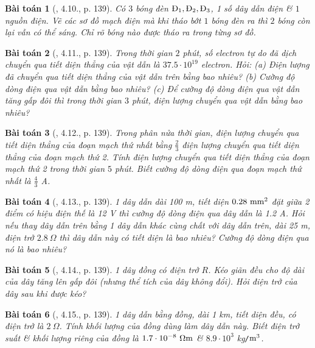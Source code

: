 \documentclass{article}
\newtheorem{baitoan}{Bài toán}
\begin{document}
\begin{baitoan}[\cite{Van_500_BT_Vat_Ly_THCS}, 4.10., p. 139]
	Có $3$ bóng đèn $\rm\mbox{Đ}_1,\mbox{Đ}_2,\mbox{Đ}_3$, 1 số dây dẫn điện \& $1$ nguồn điện. Vẽ các sơ đồ mạch điện mà khi tháo bớt $1$ bóng đèn ra thì $2$ bóng còn lại vẫn có thể sáng. Chỉ rõ bóng nào được tháo ra trong từng sơ đồ.
\end{baitoan}

\begin{baitoan}[\cite{Van_500_BT_Vat_Ly_THCS}, 4.11., p. 139]
	Trong thời gian $2$ phút, số electron tự do đã dịch chuyển qua tiết diện thẳng của vật dẫn là $37.5\cdot10^{19}$ electron. Hỏi: (a) Điện lượng đã chuyển qua tiết diện thẳng của vật dẫn trên bằng bao nhiêu? (b) Cường độ dòng điện qua vật dẫn bằng bao nhiêu? (c) Để cường độ dòng điện qua vật dẫn tăng gấp đôi thì trong thời gian $3$ phút, điện lượng chuyển qua vật dẫn bằng bao nhiêu?
\end{baitoan}

\begin{baitoan}[\cite{Van_500_BT_Vat_Ly_THCS}, 4.12., p. 139]
	Trong phân nửa thời gian, điện lượng chuyển qua tiết diện thẳng của đoạn mạch thứ nhất bằng $\frac{2}{3}$ điện lượng chuyển qua tiết diện thẳng của đoạn mạch thứ 2. Tính điện lượng chuyển qua tiết diện thẳng của đoạn mạch thứ 2 trong thời gian $5$ phút. Biết cường độ dòng điện qua đoạn mạch thứ nhất là $\frac{4}{3}$ \emph{A}.
\end{baitoan}

\begin{baitoan}[\cite{Van_500_BT_Vat_Ly_THCS}, 4.13., p. 139]
	1 dây dẫn dài \emph{100 m}, tiết diện $\rm0.28\ mm^2$ đặt giữa 2 điểm có hiệu điện thế là \emph{12 V} thì cường độ dòng điện qua dây dẫn là \emph{1.2 A}. Hỏi nếu thay dây dẫn trên bằng 1 dây dẫn khác cùng chất với dây dẫn trên, dài \emph{25 m}, điện trở $2.8\ \Omega$ thì dây dẫn này có tiết diện là bao nhiêu? Cường độ dòng điện qua nó là bao nhiêu?
\end{baitoan}

\begin{baitoan}[\cite{Van_500_BT_Vat_Ly_THCS}, 4.14., p. 139]
	1 dây đồng có điện trở $R$. Kéo giãn đều cho độ dài của dây tăng lên gấp đôi (nhưng thể tích của dây không đổi). Hỏi điện trở của dây sau khi được kéo?
\end{baitoan}

\begin{baitoan}[\cite{Van_500_BT_Vat_Ly_THCS}, 4.15., p. 139]
	1 dây dẫn bằng đồng, dài \emph{1 km}, tiết diện đều, có điện trở là $2\ \Omega$. Tính khối lượng của đồng dùng làm dây dẫn này. Biết điện trở suất \& khối lượng riêng của đồng là $\rm1.7\cdot10^{-8}\ \Omega m$ \& $8.9\cdot10^3$ \emph{kg\texttt{/}$\rm m^3$}.
\end{baitoan}


\printbibliography[heading=bibintoc]
	
\end{document}
